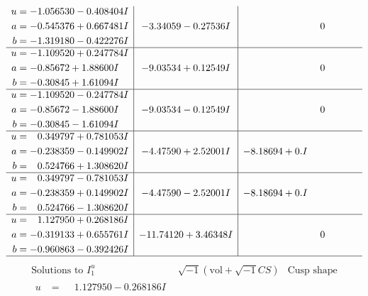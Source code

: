 \documentclass[1p]{elsarticle_modified}
\theoremstyle{definition}
\newcommand{\I}{\sqrt{-1}}
\begin{document}
$$\begin{array}{c|c|c}
\begin{aligned}
u &= -1.056530 - 0.408404 I \\
a &= -0.545376 + 0.667481 I \\
b &= -1.319180 - 0.422276 I\end{aligned}
 & -3.34059 - 0.27536 I & \phantom{-0.000000 } 0 \\ \hline\begin{aligned}
u &= -1.109520 + 0.247784 I \\
a &= -0.85672 + 1.88600 I \\
b &= -0.30845 + 1.61094 I\end{aligned}
 & -9.03534 + 0.12549 I & \phantom{-0.000000 } 0 \\ \hline\begin{aligned}
u &= -1.109520 - 0.247784 I \\
a &= -0.85672 - 1.88600 I \\
b &= -0.30845 - 1.61094 I\end{aligned}
 & -9.03534 - 0.12549 I & \phantom{-0.000000 } 0 \\ \hline\begin{aligned}
u &= \phantom{-}0.349797 + 0.781053 I \\
a &= -0.238359 - 0.149902 I \\
b &= \phantom{-}0.524766 + 1.308620 I\end{aligned}
 & -4.47590 + 2.52001 I & -8.18694 + 0. I\phantom{ +0.000000I} \\ \hline\begin{aligned}
u &= \phantom{-}0.349797 - 0.781053 I \\
a &= -0.238359 + 0.149902 I \\
b &= \phantom{-}0.524766 - 1.308620 I\end{aligned}
 & -4.47590 - 2.52001 I & -8.18694 + 0. I\phantom{ +0.000000I} \\ \hline\begin{aligned}
u &= \phantom{-}1.127950 + 0.268186 I \\
a &= -0.319133 + 0.655761 I \\
b &= -0.960863 - 0.392426 I\end{aligned}
 & -11.74120 + 3.46348 I & \phantom{-0.000000 } 0\\
 \hline 
 \end{array}$$\newpage$$\begin{array}{c|c|c}  
\text{Solutions to }I^u_{1}& \I (\text{vol} + \sqrt{-1}CS) & \text{Cusp shape}\\
 \hline 
\begin{aligned}
u &= \phantom{-}1.127950 - 0.268186 I \\

\end{aligned}
\end{array}$$
\end{document}
